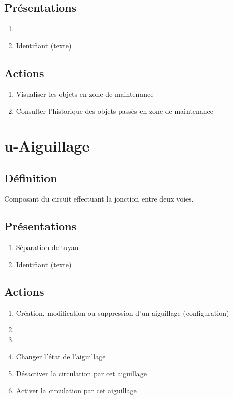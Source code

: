 \subsection{Présentations}
\begin{enumerate}
	\item \rectetiquette
	\item Identifiant (texte)
\end{enumerate}

\subsection{Actions}
\begin{enumerate}
	\item Visualiser les objets en zone de maintenance
	\item Consulter l'historique des objets passés en zone de maintenance
\end{enumerate}

\section{u-Aiguillage}
\subsection{Définition}
	Composant du circuit effectuant la jonction entre deux voies.

\subsection{Présentations}
\begin{enumerate}
	\item Séparation de tuyau
	\item Identifiant (texte)
\end{enumerate}

\subsection{Actions}
\begin{enumerate}
	\item Création, modification ou suppression d'un aiguillage (configuration)
	\item \etat
	\item \transit
	\item Changer l'état de l'aiguillage
	\item Désactiver la circulation par cet aiguillage
	\item Activer la circulation par cet aiguillage
\end{enumerate}

